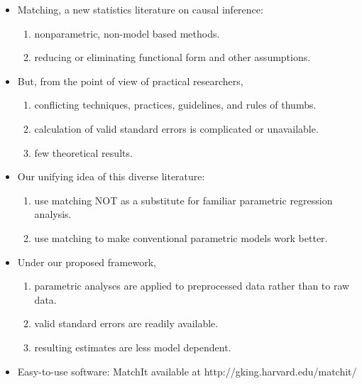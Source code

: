 \documentclass[20pt,landscape,pdftex]{foils}
\begin{document}


\hypersetup{pdfpagetransition=Replace}

\begin{itemize}
\item Matching, a new statistics literature on causal inference:\pause
  \begin{enumerate}
  \item nonparametric, non-model based methods.\pause
  \item reducing or eliminating functional form and other assumptions.\pause
  \end{enumerate}
  
\item But, from the point of view of practical researchers,\pause
  \begin{enumerate}    
  \item conflicting techniques, practices, guidelines, and rules of thumbs. \pause
  \item calculation of valid standard errors is complicated or
    unavailable.\pause
  \item few theoretical results.\pause
  \end{enumerate}

\item Our unifying idea of this diverse literature:\pause 
  \begin{enumerate}
  \item use matching NOT as a substitute for familiar parametric
    regression analysis.\pause
  \item use matching to make conventional parametric models work better.\pause
  \end{enumerate}

\item Under our proposed framework,\pause
  \begin{enumerate}
  \item parametric analyses are applied to preprocessed data rather
    than to raw data.\pause
  \item valid standard errors are readily available.\pause
  \item resulting estimates are less model dependent.\pause
  \end{enumerate} 

\item Easy-to-use software: MatchIt available at
  http://gking.harvard.edu/matchit/\pause
\end{itemize}
\end{document}
